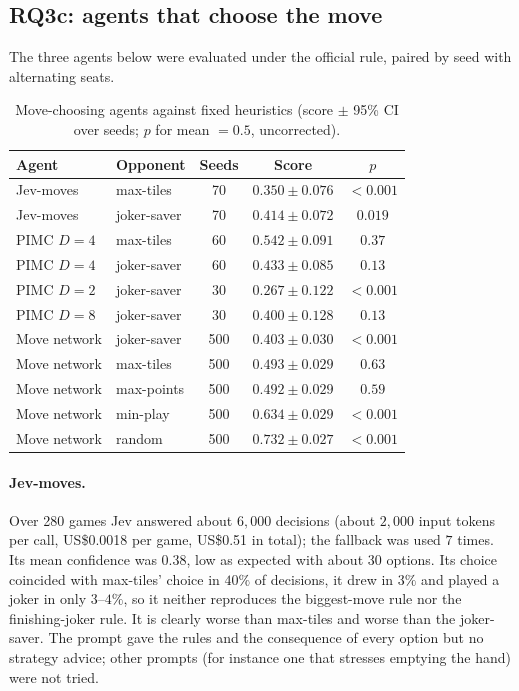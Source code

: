 \documentclass[11pt]{article}
\begin{document}
\subsection{RQ3c: agents that choose the move}\label{sec:moves}
The three agents below were evaluated under the official rule, paired by seed with alternating seats.
\begin{table}[h]\centering\small
\caption{Move-choosing agents against fixed heuristics (score $\pm$ 95\% CI over seeds; $p$ for mean $=0.5$, uncorrected).}\label{tab:moves}
\begin{tabular}{llccc}
\toprule
Agent & Opponent & Seeds & Score & $p$\\
\midrule
Jev-moves & max-tiles & 70 & $0.350\pm0.076$ & $<0.001$\\
Jev-moves & joker-saver & 70 & $0.414\pm0.072$ & $0.019$\\
PIMC $D{=}4$ & max-tiles & 60 & $0.542\pm0.091$ & $0.37$\\
PIMC $D{=}4$ & joker-saver & 60 & $0.433\pm0.085$ & $0.13$\\
PIMC $D{=}2$ & joker-saver & 30 & $0.267\pm0.122$ & $<0.001$\\
PIMC $D{=}8$ & joker-saver & 30 & $0.400\pm0.128$ & $0.13$\\
Move network & joker-saver & 500 & $0.403\pm0.030$ & $<0.001$\\
Move network & max-tiles & 500 & $0.493\pm0.029$ & $0.63$\\
Move network & max-points & 500 & $0.492\pm0.029$ & $0.59$\\
Move network & min-play & 500 & $0.634\pm0.029$ & $<0.001$\\
Move network & random & 500 & $0.732\pm0.027$ & $<0.001$\\
\bottomrule
\end{tabular}
\end{table}
\paragraph{Jev-moves.} Over 280 games Jev answered about $6{,}000$ decisions (about $2{,}000$ input tokens per call, US\$0.0018 per game, US\$0.51 in total); the fallback was used $7$ times. Its mean confidence was $0.38$, low as expected with about $30$ options. Its choice coincided with max-tiles' choice in $40\%$ of decisions, it drew in $3\%$ and played a joker in only $3$--$4\%$, so it neither reproduces the biggest-move rule nor the finishing-joker rule. It is clearly worse than max-tiles and worse than the joker-saver. The prompt gave the rules and the consequence of every option but no strategy advice; other prompts (for instance one that stresses emptying the hand) were not tried.
\end{document}
